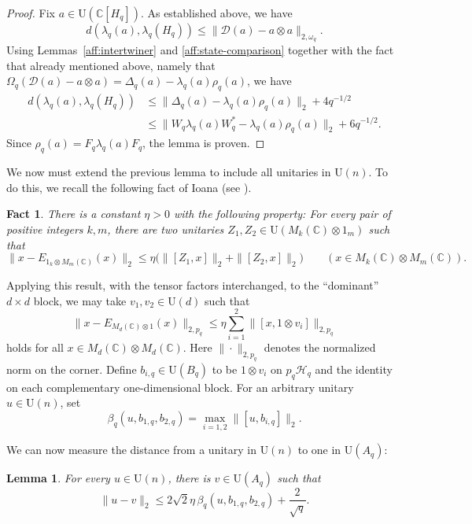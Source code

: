 \documentclass[12pt]{amsart}
\numberwithin{equation}{section}
\newtheorem{lem}[thm]{Lemma}
\newtheorem{fact}[thm]{Fact}
\theoremstyle{definition}
\newcommand{\C}{\mathbb{C}}
\def\bb{\mathbb}
\def\cal{\mathcal}
\begin{document}
\begin{proof}
Fix $a\in \mathrm{U}(\bb C[H_q])$.  As established above, we have
$$d(\lambda_q(a),\lambda_q(H_q))\leq \|\cal D(a)-a\otimes a\|_{2,\omega_q}.$$
Using  Lemmas~\ref{aff:intertwiner} and \ref{aff:state-comparison} together with the fact that already mentioned above, namely that $\Omega_q(\cal D(a)-a\otimes a)=\Delta_q(a)-\lambda_q(a)\rho_q(a)$, we have
\begin{align*}
 d(\lambda_q(a),\lambda_q(H_q))
 &\le\|\Delta_q(a)-\lambda_q(a)\rho_q(a)\|_2+4q^{-1/2}\\
 &\le\|W_q\lambda_q(a)W_q^*-\lambda_q(a)\rho_q(a)\|_2
           +6q^{-1/2}.
\end{align*}
Since $\rho_q(a)=F_q\lambda_q(a)F_q$, the lemma is proven.
\end{proof}

We now must extend the previous lemma to include all unitaries in $\mathrm{U}(n)$.  To do this, we recall the following fact of Ioana (see \cite[Proposition 4.1]{ioana2025almost}).


\begin{fact}
\label{aff:external-expander}
There is a constant $\eta>0$ with the following property:
For every pair of positive integers $k,m$, there are two unitaries
$Z_1,Z_2\in\mathrm U(M_k(\C)\otimes1_m)$ such that
\[
 \|x-E_{1_k\otimes M_m(\C)}(x)\|_2
 \le\eta\bigl(\|[Z_1,x]\|_2+\|[Z_2,x]\|_2\bigr)
 \qquad(x\in M_k(\C)\otimes M_m(\C)).
\]
\end{fact}

Applying this result, with the tensor factors interchanged, to the ``dominant'' 
$d\times d$ block, we may take  $v_1,v_2\in\mathrm U(d)$ such that
\begin{equation}
\label{aff:selector-gap}
 \|x-E_{M_d(\C)\otimes1}(x)\|_{2,p_q}
 \le\eta\sum_{i=1}^2\|[x,1\otimes v_i]\|_{2,p_q}
\end{equation}
holds for all $x\in M_d(\C)\otimes M_d(\C)$.
Here $\|\cdot\|_{2,p_q}$ denotes the normalized norm on the corner.
Define $b_{i,q}\in \mathrm{U}(B_q)$ to be $1\otimes v_i$ on $p_q\cal H_q$ and the
identity on each complementary one-dimensional block.
For an arbitrary unitary $u\in\mathrm U(n)$, set
\[
\beta_q(u,b_{1,q},b_{2,q})=\max_{i=1,2}\|[u,b_{i,q}]\|_2.
\]

We can now measure the distance from a unitary in $\mathrm{U}(n)$ to one in $\mathrm{U}(A_q)$:

\begin{lem}
\label{aff:selector-rounding}
For every $u\in\mathrm U(n)$, there is $v\in\mathrm U(A_q)$ such that
\begin{equation}
\label{aff:selector-unitary-bound}
 \|u-v\|_2\le2\sqrt2\eta\,\beta_q(u,b_{1,q},b_{2,q})+\frac2{\sqrt q}.
\end{equation}
\end{lem}
\end{document}
